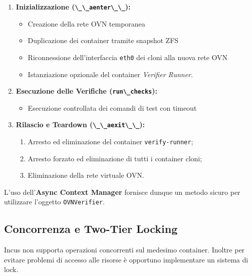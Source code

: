 \begin{enumerate}
\def\labelenumi{\arabic{enumi}.}
\tightlist
\item
  \textbf{Inizializzazione (\passthrough{\lstinline!\_\_aenter\_\_!}):}

  \begin{itemize}
  \tightlist
  \item
    Creazione della rete OVN temporanea
  \item
    Duplicazione dei container tramite snapshot ZFS
  \item
    Riconnessione dell'interfaccia \passthrough{\lstinline!eth0!} dei
    cloni alla nuova rete OVN
  \item
    Istanziazione opzionale del container \emph{Verifier Runner}.
  \end{itemize}
\item
  \textbf{Esecuzione delle Verifiche
  (\passthrough{\lstinline!run\_checks!}):}

  \begin{itemize}
  \tightlist
  \item
    Esecuzione controllata dei comandi di test con timeout
  \end{itemize}
\item
  \textbf{Rilascio e Teardown
  (\passthrough{\lstinline!\_\_aexit\_\_!}):}

  \begin{enumerate}
  \def\labelenumii{\arabic{enumii}.}
  \tightlist
  \item
    Arresto ed eliminazione del container
    \passthrough{\lstinline!verify-runner!};
  \item
    Arresto forzato ed eliminazione di tutti i container cloni;
  \item
    Eliminazione della rete virtuale OVN.
  \end{enumerate}
\end{enumerate}

L'uso dell'\textbf{Async Context Manager} fornisce dunque un metodo
sicuro per utilizzare l'oggetto \passthrough{\lstinline!OVNVerifier!}.

\subsection{Concorrenza e Two-Tier
Locking}\label{concorrenza-e-two-tier-locking}

Incus non supporta operazioni concorrenti sul medesimo container.
Inoltre per evitare problemi di accesso alle risorse è opportuno
implementare un sistema di lock.

